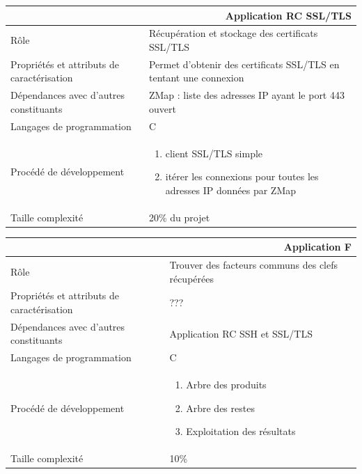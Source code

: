 \documentclass[a4paper,11pt,french]{article}
\begin{document}
\begin{center}
	\vspace*{0.7cm}
	\begin{tabularx}{16cm}{|l|X|}
	\hline
	\multicolumn{2}{|r|}{\textbf{Application RC SSL/TLS}}\\
	\hline
	R\^ole & Récupération et stockage des certificats SSL/TLS \\
	\hline
	Propriétés et attributs de caractérisation & Permet d'obtenir des certificats SSL/TLS en tentant une connexion  \\
	\hline
	Dépendances avec d'autres constituants & ZMap : liste des adresses IP ayant le port 443 ouvert\\
	\hline
	Langages de programmation & C \\
	\hline
	Procédé de développement & \begin{enumerate} \item client SSL/TLS simple \item itérer les connexions pour toutes les adresses IP données par ZMap \end{enumerate} \\
	\hline
	Taille complexité & 20\% du projet\\
	\hline
	\end{tabularx}
\end{center}


\begin{center}
	\vspace*{0.7cm}
	\begin{tabularx}{16cm}{|l|X|}
	\hline
	\multicolumn{2}{|r|}{\textbf{Application F}}\\
	\hline
	R\^ole & Trouver des facteurs communs des clefs récupérées\\
	\hline
	Propriétés et attributs de caractérisation & ???\\
	\hline
	Dépendances avec d'autres constituants & Application RC SSH et SSL/TLS\\
	\hline
	Langages de programmation & C\\
	\hline
	Procédé de développement & \begin{enumerate} \item Arbre des produits \item Arbre des restes \item Exploitation des résultats \end{enumerate}\\
	\hline
	Taille complexité & 10\%\\
	\hline
	\end{tabularx}
\end{center}
\end{document}
